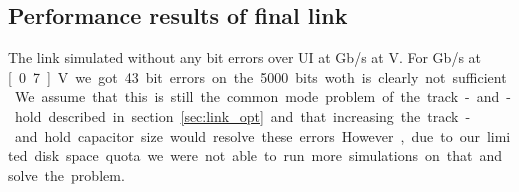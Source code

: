 \subsection{Performance results of final link}

The link simulated without any bit errors over \unit[5000]{UI} at \unit[2]{Gb/s} at \unit[1]{V}. For \unit[10]{Gb/s} at \unit[0.7]{V} we got 43 bit errors on the 5000 bits woth is clearly not sufficient. We assume that this is still the common mode problem of the track-and-hold described in section \ref{sec:link_opt} and that increasing the track-and.hold capacitor size would resolve these errors. However, due to our limited disk space quota we were not able to run more simulations on that and solve the problem.

